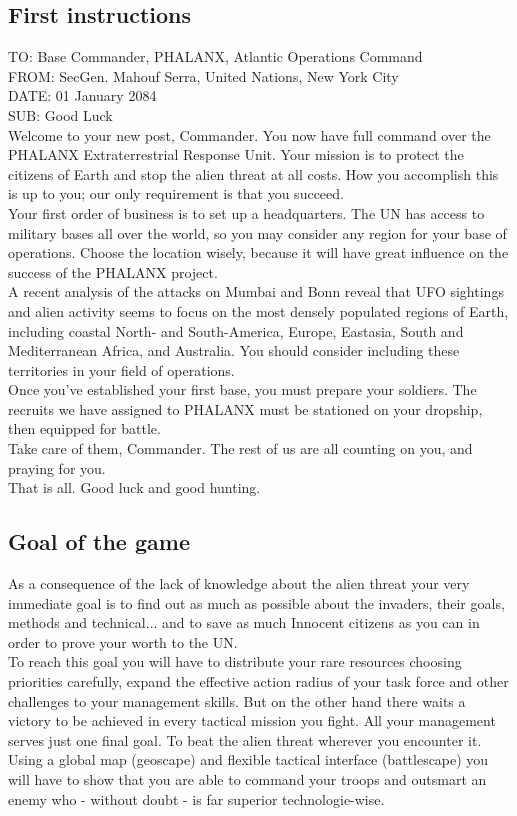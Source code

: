 \subsection{First instructions}
TO: Base Commander, PHALANX, Atlantic Operations Command\\
FROM: SecGen. Mahouf Serra, United Nations, New York City\\
DATE: 01 January 2084\\
SUB: Good Luck\\
Welcome to your new post, Commander. You now have full command over the PHALANX Extraterrestrial Response Unit. Your mission is to protect the citizens of Earth and stop the alien threat at all costs. How you accomplish this is up to you; our only requirement is that you succeed.\\
Your first order of business is to set up a headquarters. The UN has access to military bases all over the world, so you may consider any region for your base of operations. Choose the location wisely, because it will have great influence on the success of the PHALANX project.\\
A recent analysis of the attacks on Mumbai and Bonn reveal that UFO sightings and alien activity seems to focus on the most densely populated regions of Earth, including coastal North- and South-America, Europe, Eastasia, South and Mediterranean Africa, and Australia. You should consider including these territories in your field of operations.\\
Once you've established your first base, you must prepare your soldiers. The recruits we have assigned to PHALANX must be stationed on your dropship, then equipped for battle.\\
Take care of them, Commander. The rest of us are all counting on you, and praying for you.\\
That is all. Good luck and good hunting. \\
\subsection{Goal of the game}
As a consequence of the lack of knowledge about the alien threat your very immediate goal is to find out as much as possible about the invaders, their goals, methods and technical... and to save as much Innocent citizens as you can in order to prove your worth to the UN.\\
To reach this goal you will have to distribute your rare resources choosing priorities carefully, expand the effective action radius of your task force and other challenges to your management skills. But on the other hand there waits a victory to be achieved in every tactical mission you fight. All your management serves just one final goal. To beat the alien threat wherever you encounter it. Using a global map (geoscape) and flexible tactical interface (battlescape) you will have to show that you are able to command your troops and outsmart an enemy who - without doubt - is far superior technologie-wise.
